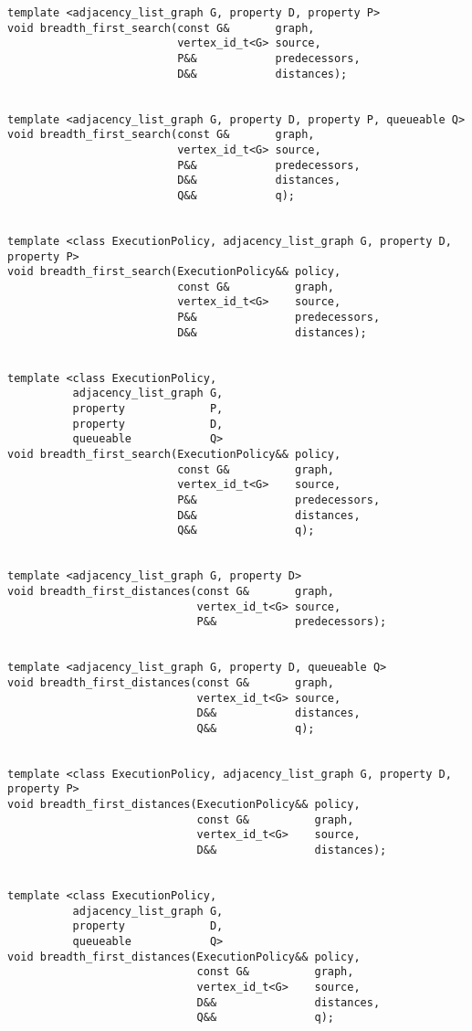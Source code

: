 \begin{lstlisting}
template <adjacency_list_graph G, property D, property P>
void breadth_first_search(const G&       graph,
                          vertex_id_t<G> source,
                          P&&            predecessors,
                          D&&            distances);


template <adjacency_list_graph G, property D, property P, queueable Q>
void breadth_first_search(const G&       graph,
                          vertex_id_t<G> source,
                          P&&            predecessors,
                          D&&            distances,
                          Q&&            q);


template <class ExecutionPolicy, adjacency_list_graph G, property D, property P>
void breadth_first_search(ExecutionPolicy&& policy,
                          const G&          graph,
                          vertex_id_t<G>    source,
                          P&&               predecessors,
                          D&&               distances);


template <class ExecutionPolicy,
          adjacency_list_graph G,
          property             P,
          property             D,
          queueable            Q>
void breadth_first_search(ExecutionPolicy&& policy,
                          const G&          graph,
                          vertex_id_t<G>    source,
                          P&&               predecessors,
                          D&&               distances,
                          Q&&               q);


template <adjacency_list_graph G, property D>
void breadth_first_distances(const G&       graph,
                             vertex_id_t<G> source,
                             P&&            predecessors);


template <adjacency_list_graph G, property D, queueable Q>
void breadth_first_distances(const G&       graph,
                             vertex_id_t<G> source,
                             D&&            distances,
                             Q&&            q);


template <class ExecutionPolicy, adjacency_list_graph G, property D, property P>
void breadth_first_distances(ExecutionPolicy&& policy,
                             const G&          graph,
                             vertex_id_t<G>    source,
                             D&&               distances);


template <class ExecutionPolicy,
          adjacency_list_graph G,
          property             D,
          queueable            Q>
void breadth_first_distances(ExecutionPolicy&& policy,
                             const G&          graph,
                             vertex_id_t<G>    source,
                             D&&               distances,
                             Q&&               q);

\end{lstlisting}

